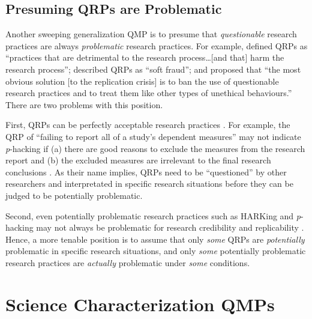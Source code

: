 \documentclass[authordate, meta]{jote-new-article}
\begin{document}
\subsection{Presuming QRPs are Problematic}



Another sweeping generalization QMP is to presume that \emph{questionable} research practices are always \emph{problematic} research practices. For example, \textcite[p. 1]{Hartgerink2016} defined QRPs as “practices that are detrimental to the research process…[and that] harm the research process”; \textcite{Chambers2014} described QRPs as “soft fraud”; and \textcite[p. 372]{Schimmack2020} proposed that “the most obvious solution [to the replication crisis] is to ban the use of questionable research practices and to treat them like other types of unethical behaviours.” There are two problems with this position.



First, QRPs can be perfectly acceptable research practices \parencites{Fiedler2016}[Table 6]{Moran2022}[p. 551]{Rubin2022}{Sacco2019}. For example, the QRP of “failing to report all of a study’s dependent measures” \parencites[p. 525]{John2012} may not indicate \emph{p}-hacking if (a) there are good reasons to exclude the measures from the research report and (b) the excluded measures are irrelevant to the final research conclusions \parencites[p. 46]{Fiedler2016}[p. 531]{John2012}{Rubin2017b}{Rubin2020}. As their name implies, QRPs need to be “questioned” by other researchers and interpretated in specific research situations before they can be judged to be potentially problematic.



Second, even potentially problematic research practices such as HARKing and \emph{p}-hacking may not always be problematic for research credibility and replicability \parencites[e.g.,][]{Bak-Coleman2022}{Devezer2019}{Fanelli2018}{Leung2011}{Rubin2017a}{Rubin2017b}{Rubin2020}{Rubin2022}{Stanley2018}{Ulrich2020}{Vancouver2018}. Hence, a more tenable position is to assume that only \emph{some} QRPs are \emph{potentially} problematic in specific research situations, and only \emph{some} potentially problematic research practices are \emph{actually} problematic under \emph{some} conditions.



\section{Science Characterization QMPs}
\end{document}
